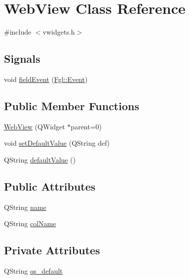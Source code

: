 \hypertarget{classWebView}{
\section{WebView Class Reference}
\label{classWebView}
}


{\ttfamily \#include $<$vwidgets.h$>$}

\subsection*{Signals}
\begin{DoxyCompactItemize}
\item 
void \hyperlink{classWebView_a432e077e0426cde506441ed364897f58}{fieldEvent} (\hyperlink{structFgl_1_1Event}{Fgl::Event})
\end{DoxyCompactItemize}
\subsection*{Public Member Functions}
\begin{DoxyCompactItemize}
\item 
\hyperlink{classWebView_a2a73db026ad4c86d03c4e0e24be7da44}{WebView} (QWidget $\ast$parent=0)
\item 
void \hyperlink{classWebView_a2b7ff2ee2bc82e60c71bf25925beab53}{setDefaultValue} (QString def)
\item 
QString \hyperlink{classWebView_ada3e41375b60f2b6af631e2268e65ad4}{defaultValue} ()
\end{DoxyCompactItemize}
\subsection*{Public Attributes}
\begin{DoxyCompactItemize}
\item 
QString \hyperlink{classWebView_aca02a652e2c58e81ea858ed288e4e187}{name}
\item 
QString \hyperlink{classWebView_a2a624574a472c48cbdc410410036f757}{colName}
\end{DoxyCompactItemize}
\subsection*{Private Attributes}
\begin{DoxyCompactItemize}
\item 
QString \hyperlink{classWebView_a55dccc8c2c7b617ff63132d1a1f8df11}{qs\_\-default}
\end{DoxyCompactItemize}



